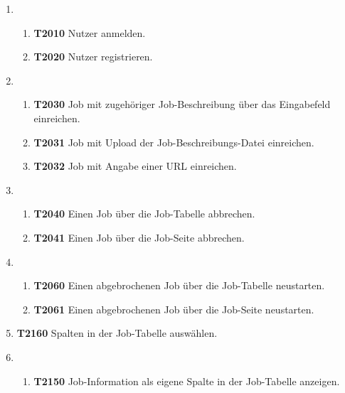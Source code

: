 \begin{enumerate}
    \item 
    \begin{enumerate}
        \item \textbf{T2010} Nutzer anmelden.
        
        \item \textbf{T2020} Nutzer registrieren.
    \end{enumerate}
    
    \item 
    \begin{enumerate}
        \item \textbf{T2030} Job mit zugehöriger Job-Beschreibung über das Eingabefeld einreichen.
        
        \item \textbf{T2031} Job mit Upload der Job-Beschreibungs-Datei einreichen.
        
        \item \textbf{T2032} Job mit Angabe einer URL einreichen.
    \end{enumerate}
    
    \item 
    \begin{enumerate}
        \item \textbf{T2040} Einen Job über die Job-Tabelle abbrechen. 
        
        \item \textbf{T2041} Einen Job über die Job-Seite abbrechen.
    \end{enumerate}
    
    \item
    \begin{enumerate}
        \item \textbf{T2060} Einen abgebrochenen Job über die Job-Tabelle neustarten.
        
        \item \textbf{T2061} Einen abgebrochenen Job über die Job-Seite neustarten. 
    \end{enumerate}
    

    \item \textbf{T2160} Spalten in der Job-Tabelle auswählen. 
    
    \item
    \begin{enumerate}
        \item \textbf{T2150} Job-Information als eigene Spalte in der Job-Tabelle anzeigen.
        

\end{enumerate}
\end{enumerate}

